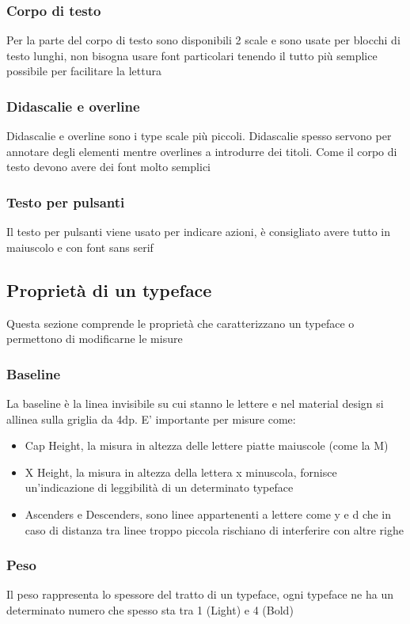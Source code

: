\documentclass[12pt, a4paper]{report}
\begin{document}
		\subsubsection{Corpo di testo}
			Per la parte del corpo di testo sono disponibili 2 scale e sono usate per blocchi di testo lunghi, non bisogna usare font particolari tenendo il tutto più semplice possibile per facilitare la lettura
		\subsubsection{Didascalie e overline}
			Didascalie e overline sono i type scale più piccoli. Didascalie spesso servono per annotare degli elementi mentre overlines a introdurre dei titoli. Come il corpo di testo devono avere dei font molto semplici
		\subsubsection{Testo per pulsanti}
			Il testo per pulsanti viene usato per indicare azioni, è consigliato avere tutto in maiuscolo e con font sans serif
	\subsection{Proprietà di un typeface}
		Questa sezione comprende le proprietà che caratterizzano un typeface o permettono di modificarne le misure
		\subsubsection{Baseline}
			La baseline è la linea invisibile su cui stanno le lettere e nel material design si allinea sulla griglia da 4dp.
			E' importante per misure come:
			\begin{itemize}
				\item Cap Height, la misura in altezza delle lettere piatte maiuscole (come la M)
    			\item X Height, la misura in altezza della lettera x minuscola, fornisce un'indicazione di leggibilità di un determinato typeface
       			\item Ascenders e Descenders, sono linee appartenenti a lettere come y e d che in caso di distanza tra linee troppo piccola rischiano di interferire con altre righe          		
			\end{itemize}
		\subsubsection{Peso}
			Il peso rappresenta lo spessore del tratto di un typeface, ogni typeface ne ha un determinato numero che spesso sta tra 1 (Light) e 4 (Bold)
\end{document}
